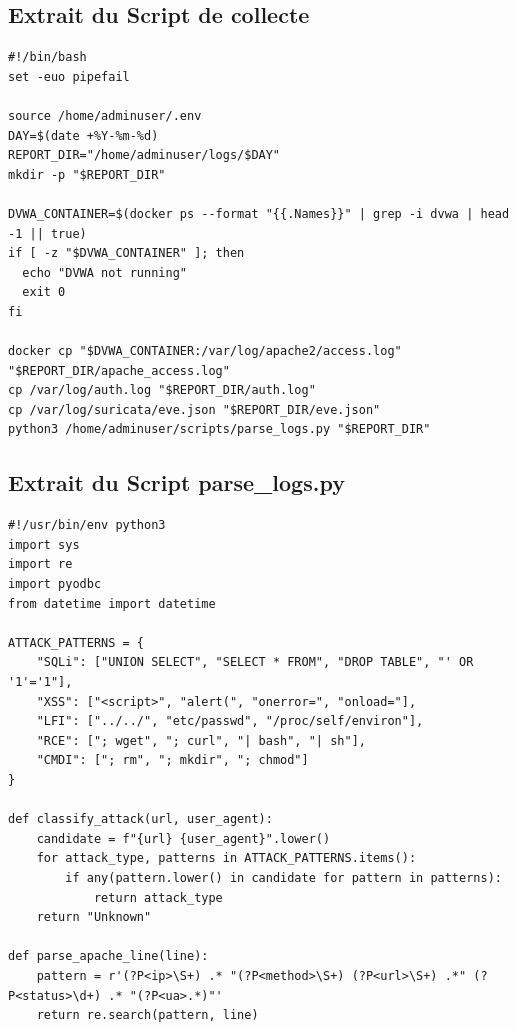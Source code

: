 \documentclass[11pt,a4paper]{report}
\begin{document}
\subsection{Extrait du Script de collecte}
\begin{lstlisting}[style=bashstyle, caption={collect\_logs.sh}]
#!/bin/bash
set -euo pipefail

source /home/adminuser/.env
DAY=$(date +%Y-%m-%d)
REPORT_DIR="/home/adminuser/logs/$DAY"
mkdir -p "$REPORT_DIR"

DVWA_CONTAINER=$(docker ps --format "{{.Names}}" | grep -i dvwa | head -1 || true)
if [ -z "$DVWA_CONTAINER" ]; then
  echo "DVWA not running"
  exit 0
fi

docker cp "$DVWA_CONTAINER:/var/log/apache2/access.log" "$REPORT_DIR/apache_access.log"
cp /var/log/auth.log "$REPORT_DIR/auth.log"
cp /var/log/suricata/eve.json "$REPORT_DIR/eve.json"
python3 /home/adminuser/scripts/parse_logs.py "$REPORT_DIR"
\end{lstlisting}

\subsection{Extrait du Script parse\_logs.py}
\begin{lstlisting}[style=pythonstyle, caption={parse\_logs.py}]
#!/usr/bin/env python3
import sys
import re
import pyodbc
from datetime import datetime

ATTACK_PATTERNS = {
    "SQLi": ["UNION SELECT", "SELECT * FROM", "DROP TABLE", "' OR '1'='1"],
    "XSS": ["<script>", "alert(", "onerror=", "onload="],
    "LFI": ["../../", "etc/passwd", "/proc/self/environ"],
    "RCE": ["; wget", "; curl", "| bash", "| sh"],
    "CMDI": ["; rm", "; mkdir", "; chmod"]
}

def classify_attack(url, user_agent):
    candidate = f"{url} {user_agent}".lower()
    for attack_type, patterns in ATTACK_PATTERNS.items():
        if any(pattern.lower() in candidate for pattern in patterns):
            return attack_type
    return "Unknown"

def parse_apache_line(line):
    pattern = r'(?P<ip>\S+) .* "(?P<method>\S+) (?P<url>\S+) .*" (?P<status>\d+) .* "(?P<ua>.*)"'
    return re.search(pattern, line)
\end{lstlisting}
\end{document}
